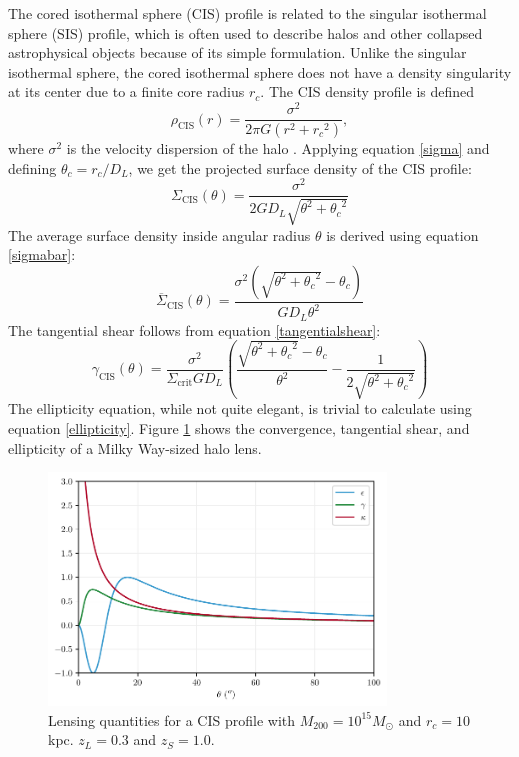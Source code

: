 \documentclass[10pt]{article}
\begin{document}
The cored isothermal sphere (CIS) profile is related to the singular isothermal sphere (SIS) profile, which is often used to describe halos and other collapsed astrophysical objects because of its simple formulation. Unlike the singular isothermal sphere, the cored isothermal sphere does not have a density singularity at its center due to a finite core radius $r_c$. The CIS density profile is defined
\begin{equation} \label{cisdensity}
\rho_\mathrm{CIS}(r) = \frac{\sigma^2}{2\pi G (r^2 + {r_c}^2)},
\end{equation}
where $\sigma^2$ is the velocity dispersion of the halo \citep{Chen2005, Shapiro1999}. Applying equation \ref{sigma} and defining $\theta_c = r_c/D_L$, we get the projected surface density of the CIS profile:
\begin{equation}
\Sigma_\mathrm{CIS}(\theta) = \frac{\sigma^2}{2 G D_L \sqrt{\theta^2 + {\theta_c}^2}}
\end{equation}
The average surface density inside angular radius $\theta$ is derived using equation \ref{sigmabar}:
\begin{equation}
\overline{\Sigma}_\mathrm{CIS}(\theta) = \frac{\sigma^2 \left(\sqrt{\theta^2 + {\theta_c}^2} - \theta_c \right)}{G D_L \theta^2}
\end{equation}
The tangential shear follows from equation \ref{tangentialshear}:
\begin{equation}
\gamma_\mathrm{CIS}(\theta) = \frac{\sigma^2}{\Sigma_\mathrm{crit} G D_L} \left(\frac{\sqrt{\theta^2 + {\theta_c}^2} - \theta_c}{\theta^2} - \frac{1}{2 \sqrt{\theta^2 + {\theta_c}^2}}\right)
\end{equation}
The ellipticity equation, while not quite elegant, is trivial to calculate using equation \ref{ellipticity}. Figure \ref{cisproperties} shows the convergence, tangential shear, and ellipticity of a Milky Way-sized halo lens.

\begin{figure}
    \centering
    \includegraphics[width=0.8\textwidth]{isothermalproperties.pdf}
    \caption{Lensing quantities for a CIS profile with $M_{200} = 10^{15} M_\odot$ and $r_c = 10$ kpc. $z_L = 0.3$ and $z_S = 1.0$.}
    \label{cisproperties}
\end{figure}
\end{document}
